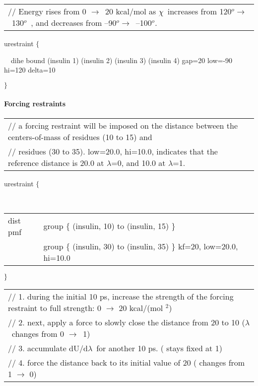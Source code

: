 \begin{tabular}{l}
{\footnotesize // Energy rises from 0 }$\rightarrow ${\footnotesize \ 20
kcal/mol as }$\chi ${\footnotesize \ {}increases from 120}$^{o}\rightarrow $%
{\footnotesize \ 130}$^{o}${\footnotesize \ , and decreases from --90}$%
^{o}\rightarrow ${\footnotesize \ --100}$^{o}${\footnotesize .}
\end{tabular}

urestraint $\{$

~~dihe bound (insulin 1) (insulin 2) (insulin 3) (insulin 4) gap=20 low=-90
hi=120 delta=10

$\}$

\paragraph*{Forcing restraints}

\begin{tabular}{l}
{\footnotesize // a forcing restraint will be imposed on the distance
between the centers-of-mass of residues (10 to 15) and} \\ 
{\footnotesize // residues (30 to 35). low=20.0, hi=10.0, indicates that the
reference distance is 20.0%
at }$\lambda ${\footnotesize =0, and 10.0%
at }$\lambda ${\footnotesize =1.}
\end{tabular}

urestraint $\{$

~~
\begin{tabular}{ll}
dist pmf & group $\{$ (insulin, 10) to (insulin, 15) $\}$ \\ 
& \hspace{0pt}group $\{$ (insulin, 30) to (insulin, 35) $\}$ kf=20,
low=20.0, hi=10.0
\end{tabular}

$\}\medskip $

\begin{tabular}{l}
{\footnotesize // 1. during the initial 10 ps, increase the strength of the
forcing restraint to full strength: 0 }$\rightarrow $ {\footnotesize 20
kcal/(mol %
}$^{2}${\footnotesize )} \\ 
{\footnotesize // 2. next, apply a force to slowly close the distance from
20 %
to 10 %
(}$\lambda ${\footnotesize \ changes from 0 }$\rightarrow ${\footnotesize \
1)} \\ 
{\footnotesize // 3. accumulate dU/d}$\lambda ${\footnotesize \ for another
10 ps. ( stays fixed at 1)} \\ 
{\footnotesize // 4. force the distance back to its initial value of 20 
( changes from 1 }$\rightarrow $ {\footnotesize 0)}
\end{tabular}

